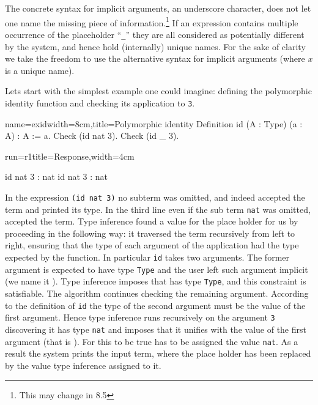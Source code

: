 The concrete syntax for implicit arguments, an underscore character,
does not let one name the missing piece of information.\footnote{This
may change in \Coq{} 8.5}  If an expression contains multiple occurrence
of the placeholder ``\lstinline/_/'' they are all considered as
potentially different by the system, and hence hold (internally)
unique names.  For the sake of clarity we take the freedom to
use the alternative syntax  for implicit arguments (where
$x$ is a unique name).


Lets start with the simplest example one could imagine: defining the
polymorphic identity function and checking its application to
\lstinline/3/.

\begin{coq}{name=exid}{width=8cm,title=Polymorphic identity}
Definition id (A : Type) (a : A) : A := a.
Check (id nat 3).
Check (id _ 3).
\end{coq}
\begin{coqout}{run=r1}{title=Response,width=4cm}

id nat 3 : nat
id nat 3 : nat
\end{coqout}

In the expression \lstinline/(id nat 3)/ no subterm was omitted, and
indeed \Coq{} accepted the term and printed its type.  In the third
line even if the sub term \lstinline/nat/ was omitted, \Coq{} accepted
the term.  Type inference found a value for the place holder
for us by proceeding in the following way:  it traversed the term
recursively from left to right, ensuring that the type of each
argument of the application had the type expected by the function.  In
particular \lstinline/id/ takes two arguments.
The former argument is expected to have type \lstinline/Type/ and the
user left such argument implicit (we name it ).   Type
inference imposes that  has type \lstinline/Type/, and this
constraint is satisfiable.  The algorithm continues checking the
remaining argument.  According to the definition of \lstinline/id/ the type of
the second argument must be the value of the first argument.  Hence
type inference runs recursively on the argument \lstinline/3/
discovering it has type \lstinline/nat/ and imposes that it unifies
with the value of the first argument (that is ).  For this
to be true  has to be assigned the value \lstinline/nat/.
As a result the system prints the input term, where the place holder
has been replaced by the value type inference assigned to it.

